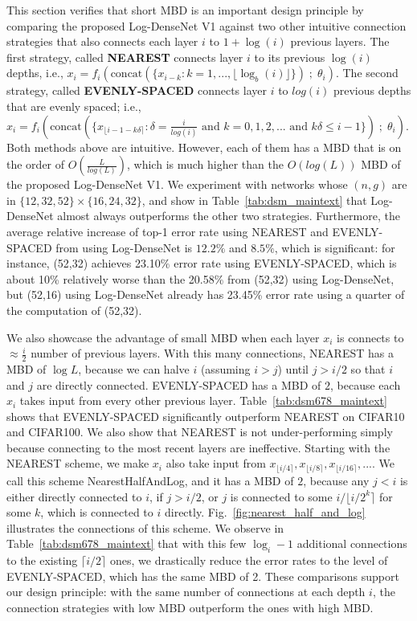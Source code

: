 \documentclass{article}
\newcommand{\concat}{\text{concat}}
\newcommand{\logdense}{Log-DenseNet\xspace}
\newcommand{\nearest}{NEAREST\xspace}
\newcommand{\evenspace}{EVENLY-SPACED\xspace}
\newcommand{\pbd}{MBD\xspace}
\newcommand{\round}[1]{\lfloor #1 \rceil}
\begin{document}
\label{sec:exp-low-backprop-distance}
This section verifies that short \pbd is an important design principle by comparing the proposed \logdense V1 against two other intuitive connection strategies that also connects each layer $i$ to  $1 + \log(i)$ previous layers. The first strategy, called \textbf{\nearest} connects layer $i$ to its previous $\log(i)$ depths, i.e., 
\mbox{$x_i = f_i(\concat(
    \{ x_{i - k} : k = 1, ..., \lfloor \log_b( i) \rfloor  \}
    )\;; \;\theta_i).
$}
The second strategy, called \textbf{\evenspace} connects layer $i$ to $log(i)$ previous depths that are evenly spaced; i.e., 
\mbox{$x_i = f_i(\concat(
    \{ x_{ \lfloor i - 1 - k \delta \rceil} : 
    \delta = \frac{i}{log(i)} \text{ and }
    k =0,1,2,... \text{ and } k\delta \leq i-1 \}
    )\;; \;\theta_i).
$}
Both methods above are intuitive. However, each of them has a \pbd that is on the order of $O(\frac{L}{log(L)})$, which is much higher than the $O(log(L))$ \pbd of the proposed \logdense V1. 
We experiment with networks whose $(n,g)$ are in $\{12, 32, 52\} \times \{16, 24, 32\}$, and show in Table~\ref{tab:dsm_maintext} that \logdense almost always outperforms the other two strategies. Furthermore, the average relative increase of top-1 error rate using \nearest and \evenspace from using \logdense is $12.2\%$ and $8.5\%$, which is significant: for instance, (52,32) achieves 23.10\% error rate using \evenspace, which is about 10\% relatively worse than the 20.58\% from (52,32) using \logdense, but (52,16) using \logdense already has 23.45\% error rate using a quarter of the computation of (52,32). 

We also showcase the advantage of small \pbd when each layer $x_i$ is connects to $\approx \frac{i}{2}$ number of previous layers. With this many connections, \nearest has a \pbd of $\log L$, because we can halve $i$ (assuming $i > j$) until $j > i /2$ so that $i$ and $j$ are directly connected. \evenspace has a \pbd of $2$, because each $x_i$ takes input from every other previous layer.  Table~\ref{tab:dsm678_maintext} shows that \evenspace significantly outperform \nearest on CIFAR10 and CIFAR100.  We also show that \nearest is not under-performing simply because connecting to the most recent layers are ineffective. Starting with the \nearest scheme, we make $x_i$ also take input from $x_{\round{i/4}}, x_{\round{i/8}}, x_{\round{i/16}},...$. We call this scheme NearestHalfAndLog, and it has a \pbd of $2$, because any $j < i$ is either directly connected to $i$, if $j > i / 2$, or $j$ is connected to some $i / \round{i / 2^k}$ for some $k$, which is connected to $i$ directly. 
Fig.~\ref{fig:nearest_half_and_log} illustrates the connections of this scheme.
We observe in Table~\ref{tab:dsm678_maintext} that with this few $\log_i -1$ additional connections to the existing $\lceil i / 2 \rceil$ ones, we drastically reduce the error rates to the level of \evenspace, which has the same \pbd of 2. 
These comparisons support our design principle: with the same number of connections at each depth $i$, the connection strategies with low \pbd outperform the ones with high \pbd.
\end{document}
